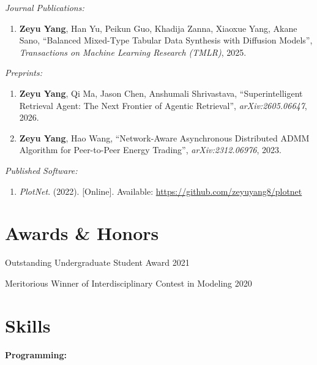 \documentclass[11pt]{article}
\begin{document}
\vspace{\lineskip}

\textit{Journal Publications:}

\begin{enumerate}[resume]
    \item \label{akane-ddpm} \textbf{Zeyu Yang}, Han Yu, Peikun Guo, Khadija Zanna, Xiaoxue Yang, Akane Sano,
    ``Balanced Mixed-Type Tabular Data Synthesis with Diffusion Models'', \textit{Transactions on Machine Learning Research (TMLR)}, 2025.
\end{enumerate}

\vspace{\lineskip}

\textit{Preprints:}

\begin{enumerate}[resume]
    \item \label{anshu-sra} \textbf{Zeyu Yang}, Qi Ma, Jason Chen, Anshumali Shrivastava, ``Superintelligent Retrieval Agent: The Next Frontier of Agentic Retrieval'', \textit{arXiv:2605.06647}, 2026.
    \item \label{hao-admm} \textbf{Zeyu Yang}, Hao Wang,
    ``Network-Aware Asynchronous Distributed ADMM Algorithm for Peer-to-Peer Energy Trading'', \textit{arXiv:2312.06976}, 2023.
\end{enumerate}

\vspace{\lineskip}

\textit{Published Software:}

\begin{enumerate}[resume]
    \item \label{joe-plotnet} \textit{PlotNet}. (2022). [Online]. Available: \url{https://github.com/zeyuyang8/plotnet}
\end{enumerate}

\section*{Awards \& Honors}

Outstanding Undergraduate Student Award \hfill 2021

Meritorious Winner of Interdisciplinary Contest in Modeling \hfill 2020

\section*{Skills}
\textbf{Programming:}
\end{document}
